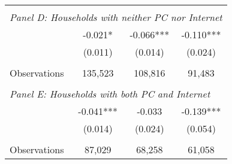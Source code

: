 {\begin{tabular}{lccc}
&  &  &   \\
\multicolumn{4}{l}{\textit{Panel D: Households with neither PC nor Internet}} \\
\hspace{3mm}        &      -0.021*  &      -0.066***&      -0.110***\\
                    &     (0.011)   &     (0.014)   &     (0.024)   \\
                    &               &               &               \\
\hspace{3mm}Observations&     135,523   &     108,816   &      91,483   \\
 
&  &  &   \\
\multicolumn{4}{l}{\textit{Panel E: Households with both PC and Internet}} \\
\hspace{3mm}        &      -0.041***&      -0.033   &      -0.139***\\
                    &     (0.014)   &     (0.024)   &     (0.054)   \\
                    &               &               &               \\
\hspace{3mm}Observations&      87,029   &      68,258   &      61,058   \\
 

\bottomrule
\end{tabular}
}
